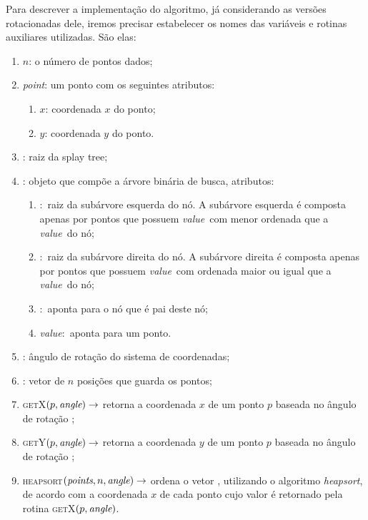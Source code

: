 

Para descrever a implementação do algoritmo, já considerando as versões rotacionadas dele, iremos
precisar estabelecer os nomes das variáveis e rotinas auxiliares utilizadas.
São elas:
\begin{enumerate}
    \item $n$: o número de pontos dados;
    \item \textit{point}: um ponto com os seguintes atributos:
    \begin{enumerate}
        \item $x$: coordenada $x$ do ponto;
        \item $y$: coordenada $y$ do ponto.
    \end{enumerate}
    \item \raiz: raiz da splay tree;
    \item \no: objeto que compõe a árvore binária de busca,
    atributos:
    \begin{enumerate}
        \item \esq$:$ raiz da subárvore esquerda do nó.
        A subárvore esquerda é composta apenas por pontos que possuem
        \textit{value}~com menor ordenada que a \textit{value}~do nó;
        \item \dir$:$ raiz da subárvore direita do nó.
        A subárvore direita é composta apenas por pontos que possuem
        \textit{value}~com ordenada maior ou igual que a \textit{value}~do nó;
        \item \pai$:$ aponta para o nó que é pai deste nó;
        \item \textit{value}$:$ aponta para um ponto.
    \end{enumerate}
    \item \angulo: ângulo de rotação do sistema de coordenadas;
    \item \pontos: vetor de $n$ posições que guarda os pontos;
    \item \textsc{getX}$(p, \textit{angle}) \rightarrow$ retorna a coordenada $x$
    de um ponto $p$ baseada no ângulo de rotação \angulo;
    \item \textsc{getY}$(p, \textit{angle}) \rightarrow$ retorna a coordenada $y$
    de um ponto $p$ baseada no ângulo de rotação \angulo;
    \item \textsc{heapsort}$(\textit{points}, n, \textit{angle}) \rightarrow$ ordena o vetor \pontos,
    utilizando o algoritmo \textit{heapsort}, de acordo com a coordenada $x$ de cada ponto cujo
    valor é retornado pela rotina \textsc{getX}$(p, \textit{angle})$.
\end{enumerate}

